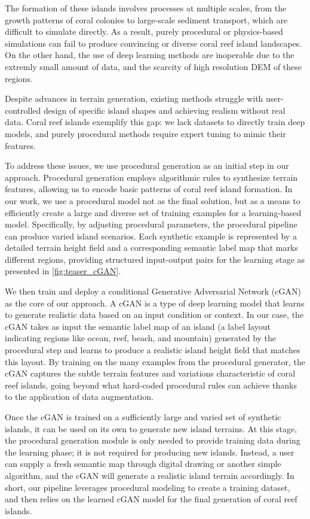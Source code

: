 The formation of these islands involves processes at multiple scales, from the growth patterns of coral colonies to large-scale sediment transport, which are difficult to simulate directly. As a result, purely procedural or physics-based simulations can fail to produce convincing or diverse coral reef island landscapes. On the other hand, the use of deep learning methods are inoperable due to the extremly small amount of data, and the scarcity of high resolution DEM of these regions.

Despite advances in terrain generation, existing methods struggle with user-controlled design of specific island shapes and achieving realism without real data. Coral reef islands exemplify this gap: we lack datasets to directly train deep models, and purely procedural methods require expert tuning to mimic their features.

To address these issues, we use procedural generation as an initial step in our approach. Procedural generation employs algorithmic rules to synthesize terrain features, allowing us to encode basic patterns of coral reef island formation. In our work, we use a procedural model not as the final solution, but as a means to efficiently create a large and diverse set of training examples for a learning-based model. Specifically, by adjusting procedural parameters, the procedural pipeline can produce varied island scenarios. Each synthetic example is represented by a detailed terrain height field and a corresponding semantic label map that marks different regions, providing structured input-output pairs for the learning stage as presented in \cref{fig:teaser_cGAN}.

We then train and deploy a conditional Generative Adversarial Network (cGAN) as the core of our approach. A cGAN is a type of deep learning model that learns to generate realistic data based on an input condition or context. In our case, the cGAN takes as input the semantic label map of an island (a label layout indicating regions like ocean, reef, beach, and mountain) generated by the procedural step and learns to produce a realistic island height field that matches this layout. By training on the many examples from the procedural generator, the cGAN captures the subtle terrain features and variations characteristic of coral reef islands, going beyond what hard-coded procedural rules can achieve thanks to the application of data augmentation.

Once the cGAN is trained on a sufficiently large and varied set of synthetic islands, it can be used on its own to generate new island terrains. At this stage, the procedural generation module is only needed to provide training data during the learning phase; it is not required for producing new islands. Instead, a user can supply a fresh semantic map through digital drawing or another simple algorithm, and the cGAN will generate a realistic island terrain accordingly. In short, our pipeline leverages procedural modeling to create a training dataset, and then relies on the learned cGAN model for the final generation of coral reef islands.


